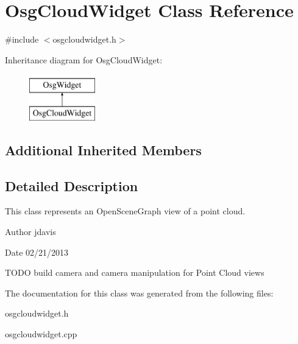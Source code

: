 \hypertarget{classOsgCloudWidget}{\section{Osg\-Cloud\-Widget Class Reference}
\label{classOsgCloudWidget}
}


{\ttfamily \#include $<$osgcloudwidget.\-h$>$}

Inheritance diagram for Osg\-Cloud\-Widget\-:\begin{figure}[H]
\begin{center}
\leavevmode
\includegraphics[height=2.000000cm]{classOsgCloudWidget}
\end{center}
\end{figure}
\subsection*{Additional Inherited Members}


\subsection{Detailed Description}
This class represents an Open\-Scene\-Graph view of a point cloud.

\begin{DoxyAuthor}{Author}
jdavis 
\end{DoxyAuthor}
\begin{DoxyDate}{Date}
02/21/2013
\end{DoxyDate}
T\-O\-D\-O build camera and camera manipulation for Point Cloud views 

The documentation for this class was generated from the following files\-:\begin{DoxyCompactItemize}
\item 
osgcloudwidget.\-h\item 
osgcloudwidget.\-cpp\end{DoxyCompactItemize}
